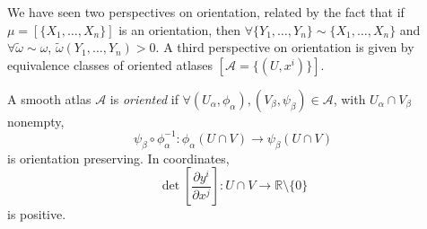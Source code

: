 We have seen two perspectives on orientation, related by the fact that
if $\mu = [\{ X_1, \dots, X_n \}]$ is an orientation, then
$\forall \{ Y_1, \dots, Y_n \} \sim \{ X_1, \dots, X_n \}$ and
$\forall \tilde{\omega} \sim \omega$,
$\tilde{\omega}(Y_1, \dots, Y_n) > 0$.
A third perspective on orientation is given by equivalence classes of
oriented atlases $[\mathcal{A} = \{(U, x^i)\}]$.

\begin{defn}
A smooth atlas $\mathcal{A}$ is \emph{oriented} if
$\forall (U_\alpha, \phi_\alpha), (V_\beta, \psi_\beta) \in
\mathcal{A}$,
with $U_\alpha \cap V_\beta$ nonempty,
$$
  \psi_\beta \circ \phi_\alpha^{-1}
: \phi_\alpha(U \cap V) \to  \psi_\beta(U \cap V)
$$
is orientation preserving. In coordinates,
$$
  \det
    \left[
      \frac{\partial y^i}{\partial x^j}
    \right]
: U \cap V \to \mathbb{R} \setminus \{ 0 \}
$$
is positive.
\end{defn}

